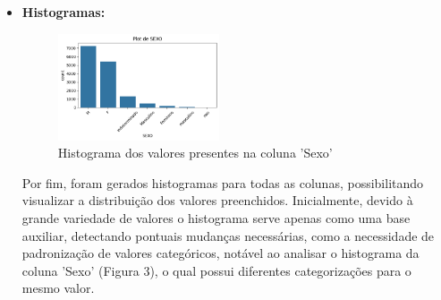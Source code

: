\documentclass[conference]{IEEEtran}
\begin{document}
\begin{itemize}
    \item \textbf{Histogramas:} \\
    \begin{figure}[ht]
        \centering
        \includegraphics[width=0.45\textwidth]{hist_sexo.png}
        \caption{Histograma dos valores presentes na coluna 'Sexo'}
        \label{fig:hist_sexo.png}
    \end{figure}
    
    Por fim, foram gerados histogramas para todas as colunas, possibilitando visualizar a distribuição dos valores preenchidos. Inicialmente, devido à grande variedade de valores o histograma serve apenas como uma base auxiliar, detectando pontuais mudanças necessárias, como a necessidade de padronização de valores categóricos, notável ao analisar o histograma da coluna 'Sexo' (Figura 3), o qual possui diferentes categorizações para o mesmo valor.
\end{itemize}
\end{document}
